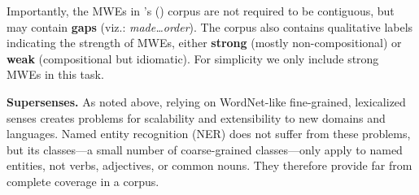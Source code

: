 \documentclass[11pt,letterpaper]{article}
\newcommand{\citeposs}[1]{\citeauthor{#1}'s (\citeyear{#1})}
\newcommand{\ensuretext}[1]{#1}
\newcommand{\nssmarker}{\ensuretext{\textcolor{magenta}{\ensuremath{^{\textsc{NS}}_{\textsc{S}}}}}}
\newcommand{\arkcomment}[3]{\ensuretext{\textcolor{#3}{[#1 #2]}}}
\newcommand{\nss}[1]{\arkcomment{\nssmarker}{#1}{magenta}}
\newcommand{\lex}[1]{\textit{#1}} %
\newcommand{\longversion}[1]{#1} %
\begin{document}
Importantly, the MWEs in \citeposs{schneider-14-corpus} corpus are not required to be contiguous, 
but may contain \textbf{gaps} (viz.: \lex{made\ldots order}). The corpus also contains qualitative labels indicating the strength of MWEs, either \textbf{strong} (mostly non-compositional) or \textbf{weak} (compositional but idiomatic). For simplicity we only include strong MWEs in this task.

\textbf{Supersenses.}
% 
As noted above, relying on WordNet-like fine-grained, lexicalized senses 
creates problems for scalability and extensibility to new domains and languages. 
Named entity recognition (NER) does not suffer from these problems, but its classes---a small number of coarse-grained classes---only apply to named entities, not verbs, adjectives, or common nouns.
They therefore provide far from complete coverage in a corpus.
\end{document}
